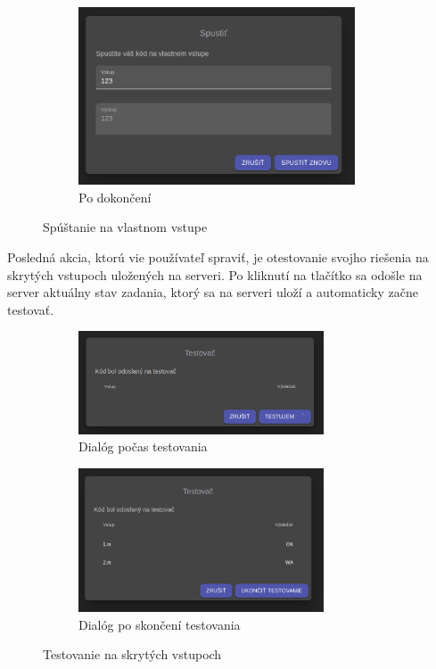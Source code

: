 \begin{figure}[H]
\begin{subfigure}{.3\textwidth}
  \includegraphics[width=0.9\textwidth]{images/spusti_dialog_koniec}
  \caption[Po dokončení]{Po dokončení}
  \label{obr:spusti_dialog_koniec}
\end{subfigure}
\caption{Spúštanie na vlastnom vstupe}
\end{figure}

Posledná akcia, ktorú vie používateľ spraviť, je otestovanie svojho riešenia na skrytých vstupoch
uložených na serveri. Po kliknutí na tlačítko sa odošle na server aktuálny stav zadania, ktorý sa
na serveri uloží a automaticky začne testovať.
\begin{figure}[H]
\centering
\begin{subfigure}{.5\textwidth}
  \centering
  \includegraphics[width=0.8\textwidth]{images/testovanie_priebeh}
  \caption[Dialóg počas testovania]{Dialóg počas testovania}
  \label{obr:testovanie_priebeh}
\end{subfigure}%
\begin{subfigure}{.5\textwidth}
  \centering
  \includegraphics[width=0.8\textwidth]{images/testovanie_koniec}
  \caption[Dialóg po skončení testovania]{Dialóg po skončení testovania}
  \label{obr:testovanie_koniec}
\end{subfigure}
\caption{Testovanie na skrytých vstupoch}
\end{figure}

